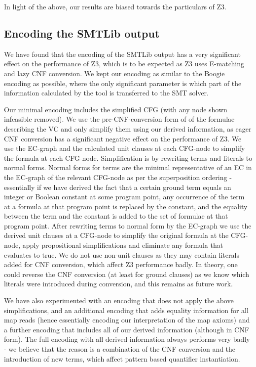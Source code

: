 In light of the above, our results are biased towards the particulars of Z3. 


\subsection*{Encoding the SMTLib output}
We have found that the encoding of the SMTLib output has a very significant effect on the performance of Z3, which is to be expected as Z3 uses E-matching and lazy CNF conversion.
We kept our encoding as similar to the Boogie encoding as possible, where the only significant parameter is which part of the information calculated by the tool is transferred to the SMT solver.

Our minimal encoding includes the simplified CFG (with any node shown infeasible removed). We use the pre-CNF-conversion form of of the formulae describing the VC and only simplify them using our derived information, as eager CNF conversion has a significant negative effect on the performance of Z3.
We use the EC-graph and the calculated unit clauses at each CFG-node to simplify the formula at each CFG-node. Simplification is by rewriting terms and literals to normal forms.
Normal forms for terms are the minimal representative of an EC in the EC-graph of the relevant CFG-node as per the superposition ordering - essentially if we have derived the fact that a certain ground term equals an integer or Boolean constant at some program point, any occurrence of the term at a formula at that program point is replaced by the constant, and the equality between the term and the constant is added to the set of formulae at that program point. After rewriting terms to normal form by the EC-graph we use the derived unit clauses at a CFG-node to simplify the original formula at the CFG-node, apply propositional simplifications and eliminate any formula that evaluates to true. We do not use non-unit clauses as they may contain literals added for CNF conversion, which affect Z3 performance badly. In theory, one could reverse the CNF conversion (at least for ground clauses) as we know which literals were introduced during conversion, and this remains as future work.

We have also experimented with an encoding that does not apply the above simplifications, and an additional encoding that adds equality information for all map reads (hence essentially encoding our interpretation of the map axioms) and a further encoding that includes all of our derived information (although in CNF form).
The full encoding with all derived information always performs very badly - we believe that the reason is a combination of the CNF conversion and the introduction of new terms, which affect pattern based quantifier instantiation.

